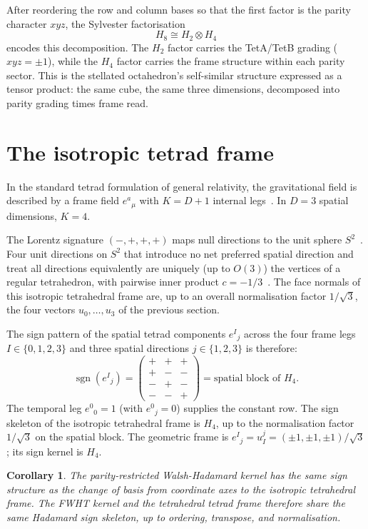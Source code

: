 \documentclass[11pt]{article}
\newtheorem{corollary}[theorem]{Corollary}
\begin{document}
After reordering the row and column bases so that the first factor
is the parity character $xyz$, the Sylvester factorisation
\[
        H_8 \cong H_2\otimes H_4
\]
encodes this decomposition.  The $H_2$ factor carries the
TetA/TetB grading ($xyz=\pm 1$), while the $H_4$ factor carries
the frame structure within each parity sector.  This is the
stellated octahedron's self-similar structure expressed as a tensor
product: the same cube, the same three dimensions, decomposed into
parity grading times frame read.


\section{The isotropic tetrad frame}

In the standard tetrad formulation of general relativity, the
gravitational field is described by a frame field $e^a{}_\mu$ with
$K=D+1$ internal legs~\cite{MTW}.  In $D=3$ spatial dimensions,
$K=4$.

The Lorentz signature $(-,+,+,+)$ maps null directions to the
unit sphere $S^2$~\cite{NelsonA}.  Four unit directions on $S^2$
that introduce no net preferred spatial direction and treat all
directions equivalently are uniquely (up to $O(3)$) the vertices
of a regular tetrahedron, with pairwise inner product
$c=-1/3$~\cite{NelsonA,Coxeter}.  The face normals of this
isotropic tetrahedral frame are, up to an overall normalisation
factor $1/\sqrt{3}$, the four vectors $u_0,\ldots,u_3$ of the
previous section.

The sign pattern of the spatial tetrad components $e^I{}_j$ across
the four frame legs $I\in\{0,1,2,3\}$ and three spatial directions
$j\in\{1,2,3\}$ is therefore:
\[
\operatorname{sgn}(e^I{}_j) =
\begin{pmatrix}
+ & + & + \\
+ & - & - \\
- & + & - \\
- & - & +
\end{pmatrix}
= \text{spatial block of } H_4.
\]
The temporal leg $e^0{}_0=1$ (with $e^0{}_j=0$) supplies the
constant row.  The sign skeleton of the isotropic tetrahedral
frame is $H_4$, up to the normalisation factor $1/\sqrt{3}$ on
the spatial block.  The geometric frame is
$e^I{}_j = u_I^j = (\pm1,\pm1,\pm1)/\sqrt{3}$; its sign kernel
is $H_4$.

\begin{corollary}
The parity-restricted Walsh-Hadamard kernel has the same sign
structure as the change of basis from coordinate axes to the
isotropic tetrahedral frame.  The FWHT kernel and the tetrahedral
tetrad frame therefore share the same Hadamard sign skeleton, up
to ordering, transpose, and normalisation.
\end{corollary}
\end{document}
